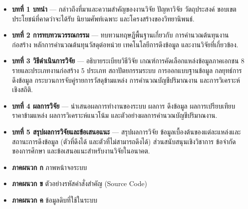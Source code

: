\begin{itemize}[leftmargin=2em]
  \item \textbf{บทที่ 1 บทนำ} --- กล่าวถึงที่มาและความสำคัญของงานวิจัย
        ปัญหาวิจัย วัตถุประสงค์ ขอบเขต ประโยชน์ที่คาดว่าจะได้รับ
        นิยามศัพท์เฉพาะ และโครงสร้างของวิทยานิพนธ์.
  \item \textbf{บทที่ 2 การทบทวนวรรณกรรม} --- ทบทวนทฤษฎีพื้นฐานเกี่ยวกับ
        การคำนวณต้นทุนงานก่อสร้าง หลักการคำนวณต้นทุนวัสดุต่อหน่วย
        เทคโนโลยีการดึงข้อมูล และงานวิจัยที่เกี่ยวข้อง.
  \item \textbf{บทที่ 3 วิธีดำเนินการวิจัย} --- อธิบายระเบียบวิธีวิจัย
        เกณฑ์การคัดเลือกแหล่งข้อมูลภาคเอกชน 8 รายและประเภทงานก่อสร้าง
        5 ประเภท สถาปัตยกรรมระบบ การออกแบบฐานข้อมูล กลยุทธ์การดึงข้อมูล
        กระบวนการจับคู่รายการวัสดุข้ามแหล่ง การคำนวณบัญชีปริมาณงาน
        และการวิเคราะห์เชิงสถิติ.
  \item \textbf{บทที่ 4 ผลการวิจัย} --- นำเสนอผลการทำงานของระบบ ผลการ
        ดึงข้อมูล ผลการเปรียบเทียบราคาข้ามแหล่ง ผลการวิเคราะห์แนวโน้ม
        และตัวอย่างผลการคำนวณบัญชีปริมาณงาน.
  \item \textbf{บทที่ 5 สรุปผลการวิจัยและข้อเสนอแนะ} --- สรุปผลการวิจัย
        ข้อมูลเบื้องต้นของแต่ละแหล่งและสถานะการดึงข้อมูล (ตัวที่ดึงได้
        และตัวที่ไม่สามารถดึงได้) ส่วนสนับสนุนเชิงวิชาการ ข้อจำกัด
        ของการศึกษา และข้อเสนอแนะสำหรับงานวิจัยในอนาคต.
  \item \textbf{ภาคผนวก ก} ภาพหน้าจอระบบ
  \item \textbf{ภาคผนวก ข} ตัวอย่างรหัสคำสั่งสำคัญ (Source Code)
  \item \textbf{ภาคผนวก ค} ข้อมูลดิบที่ใช้ในระบบ
\end{itemize}
